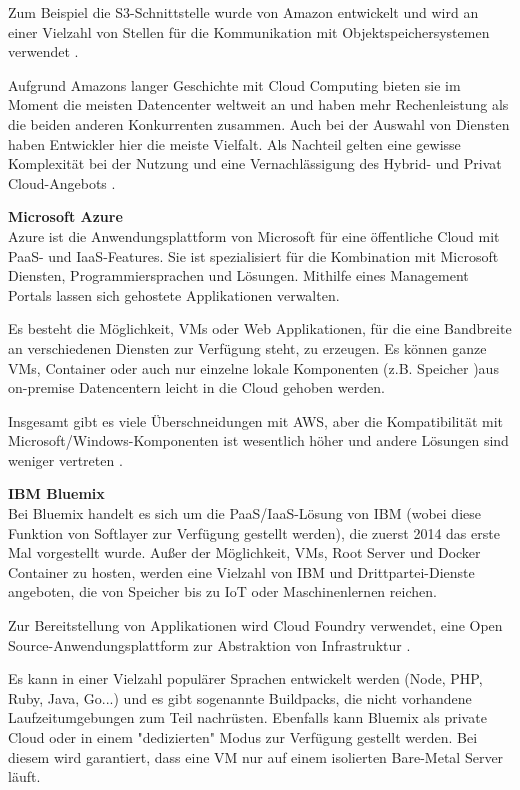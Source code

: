Zum Beispiel die \ac{S3}-Schnittstelle wurde von Amazon entwickelt und wird an einer Vielzahl von Stellen für die Kommunikation mit Objektspeichersystemen verwendet \parencite{aws.2017}.

Aufgrund Amazons langer Geschichte mit Cloud Computing bieten sie im Moment die meisten Datencenter weltweit an und haben mehr Rechenleistung als die beiden anderen Konkurrenten zusammen. Auch bei der Auswahl von Diensten haben Entwickler hier die meiste Vielfalt. Als Nachteil gelten eine gewisse Komplexität bei der Nutzung und eine Vernachlässigung des Hybrid- und Privat Cloud-Angebots \parencite{computerworlduk.2016}.


\textbf{Microsoft Azure}\\
Azure ist die Anwendungsplattform von Microsoft für eine öffentliche Cloud mit \acs{PaaS}- und \acs{IaaS}-Features. Sie ist spezialisiert für die Kombination mit Microsoft Diensten, Programmiersprachen und Lösungen. Mithilfe eines Management Portals lassen sich gehostete Applikationen verwalten. 

Es besteht die Möglichkeit, \acs{VM}s oder Web Applikationen, für die eine Bandbreite an verschiedenen Diensten zur Verfügung steht, zu erzeugen. Es können ganze \acs{VM}s, Container oder auch nur einzelne lokale Komponenten (z.B. Speicher )aus on-premise Datencentern leicht in die Cloud gehoben werden.

Insgesamt gibt es viele Überschneidungen mit \acs{AWS}, aber die Kompatibilität mit Microsoft/Windows-Komponenten ist wesentlich höher und andere Lösungen sind weniger vertreten \parencite{microsoft.2015}.


\textbf{IBM Bluemix}\\
Bei Bluemix handelt es sich um die \acs{PaaS}/\acs{IaaS}-Lösung von IBM (wobei diese Funktion von Softlayer zur Verfügung gestellt werden), die zuerst 2014 das erste Mal vorgestellt wurde. Außer der Möglichkeit, \acs{VM}s, Root Server und Docker Container zu hosten, werden eine Vielzahl von IBM und Drittpartei-Dienste angeboten, die von Speicher bis zu \ac{IoT} oder Maschinenlernen reichen.	

Zur Bereitstellung von Applikationen wird Cloud Foundry verwendet, eine Open Source-Anwendungsplattform zur Abstraktion von Infrastruktur \parencite{bluemix.2017}.

Es kann in einer Vielzahl populärer Sprachen entwickelt werden (Node, PHP, Ruby, Java, Go...) und es gibt sogenannte Buildpacks, die nicht vorhandene Laufzeitumgebungen zum Teil nachrüsten. Ebenfalls kann Bluemix als private Cloud oder in einem "dedizierten" Modus zur Verfügung gestellt werden. Bei diesem wird garantiert, dass eine \acs{VM} nur auf einem isolierten Bare-Metal Server läuft.

